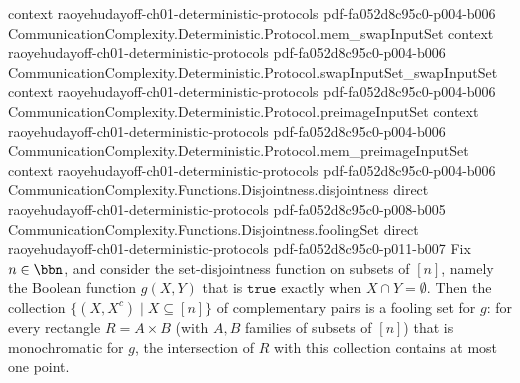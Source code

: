 \begin{theorem}
  {context}
  {raoyehudayoff-ch01-deterministic-protocols}
  {pdf-fa052d8c95c0-p004-b006}
\proofstep
  {CommunicationComplexity.Deterministic.Protocol.mem_swapInputSet}
  {context}
  {raoyehudayoff-ch01-deterministic-protocols}
  {pdf-fa052d8c95c0-p004-b006}
\proofstep
  {CommunicationComplexity.Deterministic.Protocol.swapInputSet_swapInputSet}
  {context}
  {raoyehudayoff-ch01-deterministic-protocols}
  {pdf-fa052d8c95c0-p004-b006}
\proofstep
  {CommunicationComplexity.Deterministic.Protocol.preimageInputSet}
  {context}
  {raoyehudayoff-ch01-deterministic-protocols}
  {pdf-fa052d8c95c0-p004-b006}
\proofstep
  {CommunicationComplexity.Deterministic.Protocol.mem_preimageInputSet}
  {context}
  {raoyehudayoff-ch01-deterministic-protocols}
  {pdf-fa052d8c95c0-p004-b006}
\proofstep
  {CommunicationComplexity.Functions.Disjointness.disjointness}
  {direct}
  {raoyehudayoff-ch01-deterministic-protocols}
  {pdf-fa052d8c95c0-p008-b005}
\proofstep
  {CommunicationComplexity.Functions.Disjointness.foolingSet}
  {direct}
  {raoyehudayoff-ch01-deterministic-protocols}
  {pdf-fa052d8c95c0-p011-b007}
Fix $n \in \bbn$, and consider the set-disjointness function on subsets of $[n]$, namely
the Boolean function $g(X, Y)$ that is $\mathtt{true}$ exactly when $X \cap Y =
\emptyset$. Then the collection $\{(X, X^c) \mid X \subseteq [n]\}$ of complementary
pairs is a fooling set for $g$: for every rectangle $R = A \times B$ (with $A, B$
families of subsets of $[n]$) that is monochromatic for $g$, the intersection of $R$
with this collection contains at most one point.
\end{theorem}

